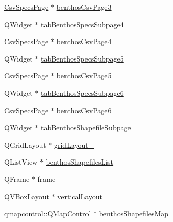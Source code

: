 \begin{DoxyCompactItemize}
\item 
\mbox{\hyperlink{class_csv_specs_page}{Csv\+Specs\+Page}} $\ast$ \mbox{\hyperlink{class_ui___vessel_editor_main_window_aee49de4dbec80b004403122297ebc0d4}{benthos\+Csv\+Page3}}
\item 
Q\+Widget $\ast$ \mbox{\hyperlink{class_ui___vessel_editor_main_window_ad94cfa4e66e2313da2163638d7d71a72}{tab\+Benthos\+Specs\+Subpage4}}
\item 
\mbox{\hyperlink{class_csv_specs_page}{Csv\+Specs\+Page}} $\ast$ \mbox{\hyperlink{class_ui___vessel_editor_main_window_abf41b9b375f5cef2acc6198789786476}{benthos\+Csv\+Page4}}
\item 
Q\+Widget $\ast$ \mbox{\hyperlink{class_ui___vessel_editor_main_window_a5382ed8ca3dc76a483ac0a1a91b3bfb5}{tab\+Benthos\+Specs\+Subpage5}}
\item 
\mbox{\hyperlink{class_csv_specs_page}{Csv\+Specs\+Page}} $\ast$ \mbox{\hyperlink{class_ui___vessel_editor_main_window_afdfaf15820c3efe23ac140bd54a46a7a}{benthos\+Csv\+Page5}}
\item 
Q\+Widget $\ast$ \mbox{\hyperlink{class_ui___vessel_editor_main_window_a01cb8483c16b36559c85afb913b6e613}{tab\+Benthos\+Specs\+Subpage6}}
\item 
\mbox{\hyperlink{class_csv_specs_page}{Csv\+Specs\+Page}} $\ast$ \mbox{\hyperlink{class_ui___vessel_editor_main_window_a96a066962db45ea918da66d9f8f06526}{benthos\+Csv\+Page6}}
\item 
Q\+Widget $\ast$ \mbox{\hyperlink{class_ui___vessel_editor_main_window_af514e3c89c66eb158e93a7208db84b53}{tab\+Benthos\+Shapefile\+Subpage}}
\item 
Q\+Grid\+Layout $\ast$ \mbox{\hyperlink{class_ui___vessel_editor_main_window_a23601764aebdb7c9fa5463ba5678a30e}{grid\+Layout\+\_}}
\item 
Q\+List\+View $\ast$ \mbox{\hyperlink{class_ui___vessel_editor_main_window_ab84b5f4ed27643336171612fb7c31aca}{benthos\+Shapefiles\+List}}
\item 
Q\+Frame $\ast$ \mbox{\hyperlink{class_ui___vessel_editor_main_window_af6bf7c2d6c36b2e2a56a99d524b4d5a1}{frame\+\_}}
\item 
Q\+V\+Box\+Layout $\ast$ \mbox{\hyperlink{class_ui___vessel_editor_main_window_af73fb6478a9d8a5ce84ba07bf8ee7024}{vertical\+Layout\+\_}}
\item 
qmapcontrol\+::\+Q\+Map\+Control $\ast$ \mbox{\hyperlink{class_ui___vessel_editor_main_window_ac215b26f2baf76ebac6f9ecf0b7bb4d2}{benthos\+Shapefiles\+Map}}
\item 

\end{DoxyCompactItemize}
